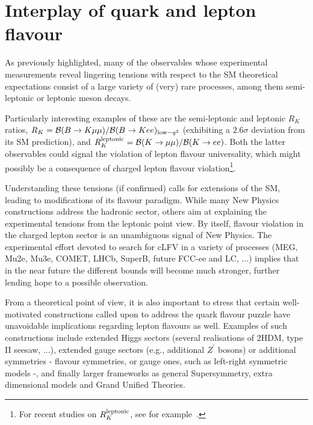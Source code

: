 \section{Interplay of quark and lepton flavour}

As previously highlighted, many of the observables whose experimental
measurements reveal lingering tensions with respect to the SM
theoretical expectations consist of a large variety of 
(very) rare processes, among them semi-leptonic
or leptonic meson decays.

Particularly interesting examples of
these are the semi-leptonic and leptonic $R_K$ ratios, 
$R_K = {\cal B}(B\rightarrow K\mu\mu)/{\cal B}(B\rightarrow Kee)_{{\rm low}-q^2}$ (exhibiting a 
$2.6\sigma$ deviation from its SM prediction), and 
$R_K^{\rm leptonic} = {\cal B}(K\rightarrow \mu\mu)/{\cal B}(K\rightarrow ee)$.
Both the latter observables could signal the violation of lepton flavour
universality, which might possibly be a consequence of charged lepton
flavour violation\footnote{For recent studies on $R_K^{\rm leptonic}$, see for
  example~\cite{Fonseca:2012kr,Abada:2012mc,Abada:2013aba}.}.   
 
Understanding these tensions (if confirmed) calls for extensions of the SM, 
leading to modifications of its flavour paradigm. While many New Physics
constructions address the hadronic sector, others aim at explaining 
the experimental tensions
from the leptonic point view. 
By itself, flavour violation in the charged lepton sector is an 
unambiguous signal of New Physics. The experimental effort
devoted to search for cLFV in a variety of processes 
(MEG, Mu2e, Mu3e, COMET, LHCb, SuperB, future FCC-ee and LC, ...)
implies that in the near future the 
different bounds will become much stronger, further lending hope to a
possible observation. 

From a theoretical point of view, it is also important to stress that
certain well-motivated constructions called upon to address the quark flavour
puzzle have unavoidable implications regarding lepton flavours as
well. 
Examples of such constructions include extended Higgs sectors
(several realisations of 2HDM, type II seesaw, ...),
extended gauge sectors 
(e.g., additional $Z^\prime$ bosons) or additional symmetries - flavour
symmetries, or gauge ones, such as left-right symmetric models -, and finally 
larger frameworks as general Supersymmetry, extra dimensional models and
Grand Unified Theories. 

